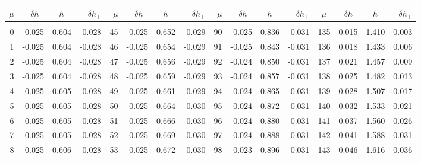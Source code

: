 \newpage
\begin{table}\centering
\small{ \begin{tabular}{rrrr|rrrr|rrrr|crrr}
$\mu$ & $\delta h_-$  & $\bar{h}~~~~$ & $\delta h_+$ &
$\mu$ & $\delta h_-$  & $\bar{h}~~~~$ & $\delta h_+$ &
$\mu$ & $\delta h_-$  & $\bar{h}~~~~$ & $\delta h_+$ &
$\mu$ & $\delta h_-$  & $\bar{h}~~~~$ & $\delta h_+$ \\\hline
&&&&&&&&&&&&&&&\\[-1.75ex]
  0 & \tiny{ -0.025} &   0.604 & \tiny{ -0.028} &  45 & \tiny{ -0.025} &   0.652 & \tiny{ -0.029} &  90 & \tiny{ -0.025} &   0.836 & \tiny{ -0.031} & 135 & \tiny{  0.015} &   1.410 & \tiny{  0.003}\\
  1 & \tiny{ -0.025} &   0.604 & \tiny{ -0.028} &  46 & \tiny{ -0.025} &   0.654 & \tiny{ -0.029} &  91 & \tiny{ -0.025} &   0.843 & \tiny{ -0.031} & 136 & \tiny{  0.018} &   1.433 & \tiny{  0.006}\\
  2 & \tiny{ -0.025} &   0.604 & \tiny{ -0.028} &  47 & \tiny{ -0.025} &   0.656 & \tiny{ -0.029} &  92 & \tiny{ -0.024} &   0.850 & \tiny{ -0.031} & 137 & \tiny{  0.021} &   1.457 & \tiny{  0.009}\\
  3 & \tiny{ -0.025} &   0.604 & \tiny{ -0.028} &  48 & \tiny{ -0.025} &   0.659 & \tiny{ -0.029} &  93 & \tiny{ -0.024} &   0.857 & \tiny{ -0.031} & 138 & \tiny{  0.025} &   1.482 & \tiny{  0.013}\\
  4 & \tiny{ -0.025} &   0.605 & \tiny{ -0.028} &  49 & \tiny{ -0.025} &   0.661 & \tiny{ -0.029} &  94 & \tiny{ -0.024} &   0.865 & \tiny{ -0.031} & 139 & \tiny{  0.028} &   1.507 & \tiny{  0.017}\\
  5 & \tiny{ -0.025} &   0.605 & \tiny{ -0.028} &  50 & \tiny{ -0.025} &   0.664 & \tiny{ -0.030} &  95 & \tiny{ -0.024} &   0.872 & \tiny{ -0.031} & 140 & \tiny{  0.032} &   1.533 & \tiny{  0.021}\\
  6 & \tiny{ -0.025} &   0.605 & \tiny{ -0.028} &  51 & \tiny{ -0.025} &   0.666 & \tiny{ -0.030} &  96 & \tiny{ -0.024} &   0.880 & \tiny{ -0.031} & 141 & \tiny{  0.037} &   1.560 & \tiny{  0.026}\\
  7 & \tiny{ -0.025} &   0.605 & \tiny{ -0.028} &  52 & \tiny{ -0.025} &   0.669 & \tiny{ -0.030} &  97 & \tiny{ -0.024} &   0.888 & \tiny{ -0.031} & 142 & \tiny{  0.041} &   1.588 & \tiny{  0.031}\\
  8 & \tiny{ -0.025} &   0.606 & \tiny{ -0.028} &  53 & \tiny{ -0.025} &   0.672 & \tiny{ -0.030} &  98 & \tiny{ -0.023} &   0.896 & \tiny{ -0.031} & 143 & \tiny{  0.046} &   1.616 & \tiny{  0.036}\\

\end{tabular}}
\end{table}
